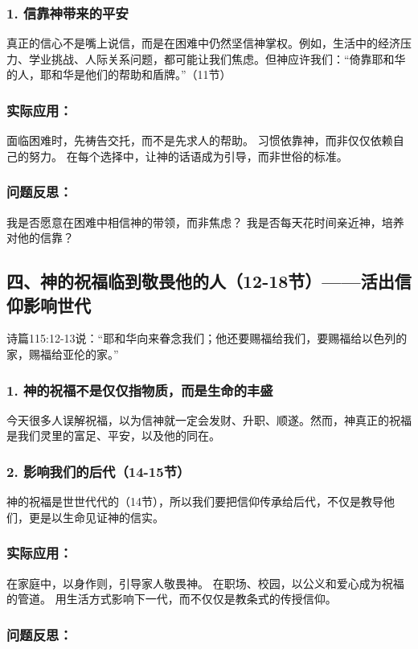 \documentclass[a4paper, 12pt]{article}
\begin{document}
\subsubsection*{1. 信靠神带来的平安}
真正的信心不是嘴上说信，而是在困难中仍然坚信神掌权。例如，生活中的经济压力、学业挑战、人际关系问题，都可能让我们焦虑。但神应许我们：“倚靠耶和华的人，耶和华是他们的帮助和盾牌。”（11节）

\subsubsection*{实际应用：}

面临困难时，先祷告交托，而不是先求人的帮助。
习惯依靠神，而非仅仅依赖自己的努力。
在每个选择中，让神的话语成为引导，而非世俗的标准。
\subsubsection*{问题反思：}

我是否愿意在困难中相信神的带领，而非焦虑？
我是否每天花时间亲近神，培养对他的信靠？
\subsection*{四、神的祝福临到敬畏他的人（12-18节）——活出信仰影响世代}
诗篇115:12-13说：“耶和华向来眷念我们；他还要赐福给我们，要赐福给以色列的家，赐福给亚伦的家。”

\subsubsection*{1. 神的祝福不是仅仅指物质，而是生命的丰盛}
今天很多人误解祝福，以为信神就一定会发财、升职、顺遂。然而，神真正的祝福是我们灵里的富足、平安，以及他的同在。

\subsubsection*{2. 影响我们的后代（14-15节）}
神的祝福是世世代代的（14节），所以我们要把信仰传承给后代，不仅是教导他们，更是以生命见证神的信实。

\subsubsection*{实际应用：}

在家庭中，以身作则，引导家人敬畏神。
在职场、校园，以公义和爱心成为祝福的管道。
用生活方式影响下一代，而不仅仅是教条式的传授信仰。
\subsubsection*{问题反思：}
\end{document}
